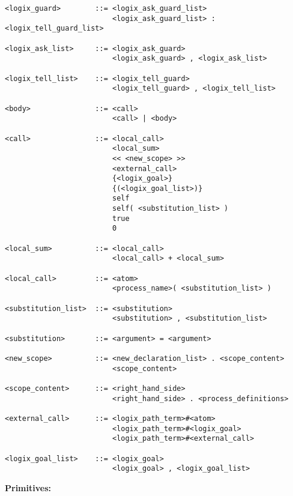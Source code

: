 \begin{verbatim}
<logix_guard>        ::= <logix_ask_guard_list>
                         <logix_ask_guard_list> : <logix_tell_guard_list>

<logix_ask_list>     ::= <logix_ask_guard>
                         <logix_ask_guard> , <logix_ask_list>

<logix_tell_list>    ::= <logix_tell_guard>
                         <logix_tell_guard> , <logix_tell_list>

<body>               ::= <call>
                         <call> | <body>

<call>               ::= <local_call>
                         <local_sum>
                         << <new_scope> >>
                         <external_call>
                         {<logix_goal>}
                         {(<logix_goal_list>)}
                         self
                         self( <substitution_list> )
                         true
                         0

<local_sum>          ::= <local_call>
                         <local_call> + <local_sum>

<local_call>         ::= <atom>
                         <process_name>( <substitution_list> )

<substitution_list>  ::= <substitution>
                         <substitution> , <substitution_list>

<substitution>       ::= <argument> = <argument>

<new_scope>          ::= <new_declaration_list> . <scope_content>
                         <scope_content>

<scope_content>      ::= <right_hand_side>
                         <right_hand_side> . <process_definitions>

<external_call>      ::= <logix_path_term>#<atom>
                         <logix_path_term>#<logix_goal>
                         <logix_path_term>#<external_call>

<logix_goal_list>    ::= <logix_goal>
                         <logix_goal> , <logix_goal_list>
\end{verbatim}


\noindent
{\bf\Large Primitives:}


